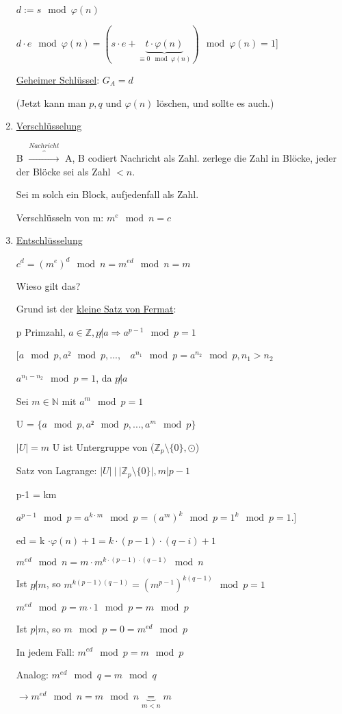 \begin{enumerate}[label=(\alph*)]
  $d := s \mod \varphi(n)$ 

  $d \cdot e \mod \varphi(n) = (s \cdot e + \underbrace{t \cdot \varphi(n)}_{\equiv 0 \mod \varphi(n)}) \mod \varphi(n) = 1$]

  \underline{Geheimer Schlüssel}: $G_A = d$

  (Jetzt kann man $p,q$ und $\varphi(n)$ löschen, und sollte es auch.)

  \item \underline{Verschlüsselung}

  B $\overbrace{\rightarrow}^{Nachricht}$ A, B codiert Nachricht als Zahl. zerlege die Zahl in Blöcke, jeder der Blöcke sei als Zahl $< n$.

  Sei m solch ein Block, aufjedenfall als Zahl.

  Verschlüsseln von m: $m^e \mod n = c$

  \item \underline{Entschlüsselung}

  $c^d = (m^e)^d \mod n = m^{ed} \mod n = m$
  
  Wieso gilt das?

  Grund ist der \underline{kleine Satz von Fermat}:

  p Primzahl, $a \in \mathbb{Z}, p \not | a \Rightarrow a^{p-1} \mod p = 1$

  [$a \mod p, a² \mod p, ..., \ \ \ \ a^{n_1} \mod p = a^{n_2} \mod p, n_1 > n_2$

  $a^{n_1 - n_2} \mod p = 1$, da $p \not | a$

  Sei $m \in \mathbb{N}$ mit $a^m \mod p = 1$

  U = $\{a \mod p, a² \mod p, ..., a^m \mod p \}$

  $|U| = m$   U ist Untergruppe von ($\mathbb{Z}_p \setminus \{0\}, \odot$)

  Satz von Lagrange: $|U|\ | \ |\mathbb{Z}_p \setminus \{0\}|, m|p-1$

  p-1 = km

  $a^{p-1} \mod p = a^{k \cdot m} \mod p = (a^m)^k \mod p = 1^k \mod p = 1$.]

  ed = k $\cdot \varphi(n) + 1 =  k \cdot (p-1) \cdot (q-i) + 1$

  $m^{ed} \mod n = m \cdot m^{k \cdot (p-1) \cdot (q-1)} \mod n$
  
  Ist $p \not | m$, so $m^{k(p-1)(q-1)} = (m^{p-1})^{k(q-1)} \mod p = 1$

  $m^{ed} \mod p = m \cdot 1 \mod p = m \mod p $

  Ist $p|m$, so $m \mod p = 0 = m^{ed} \mod p$

  In jedem Fall: $m^{ed} \mod p = m \mod p$

  \par \medskip

  Analog: $m^{ed} \mod q  = m \mod q$

  $\rightarrow m^{ed} \mod n = m \mod n \underbrace{=}_{m < n} m$
\end{enumerate}

